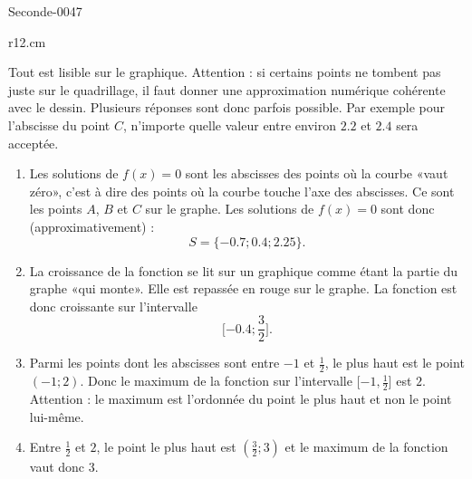 
\begin{corrige}{Seconde-0047}

\begin{wrapfigure}[7]{r}{12.cm}
   \vspace{-1.5cm}        %
   \centering
   
\end{wrapfigure}

    Tout est lisible sur le graphique. Attention : si certains points ne tombent pas juste sur le quadrillage, il faut donner une approximation numérique cohérente avec le dessin. Plusieurs réponses sont donc parfois possible. Par exemple pour l'abscisse du point \( C\), n'importe quelle valeur entre environ \( 2.2\) et \( 2.4\) sera acceptée.
    \begin{enumerate}
        \item
            Les solutions de \( f(x)=0\) sont les abscisses des points où la courbe «vaut zéro», c'est à dire des points où la courbe touche l'axe des abscisses. Ce sont les points \( A\), \( B\) et \( C\) sur le graphe. Les solutions de \( f(x)=0\) sont donc (approximativement) :
            \begin{equation}
                S=\{ -0.7;0.4;2.25 \}.
            \end{equation}
        \item
            La croissance de la fonction se lit sur un graphique comme étant la partie du graphe «qui monte». Elle est repassée en rouge sur le graphe. La fonction est donc croissante sur l'intervalle
            \begin{equation}
                \mathopen[ -0.4 ; \frac{ 3 }{2} \mathclose].
            \end{equation}
        \item
            Parmi les points dont les abscisses sont entre \( -1\) et \( \frac{ 1 }{2}\), le plus haut est le point \( (-1;2)\). Donc le maximum de la fonction sur l'intervalle \( \mathopen[ -1 , \frac{ 1 }{2} \mathclose]\) est \( 2\). Attention : le maximum est l'ordonnée du point le plus haut et non le point lui-même.
        \item
            Entre \( \frac{ 1 }{2}\) et \( 2\), le point le plus haut est \( (\frac{ 3 }{2};3)\) et le maximum de la fonction vaut donc \( 3\).

\end{enumerate}
\end{corrige}
